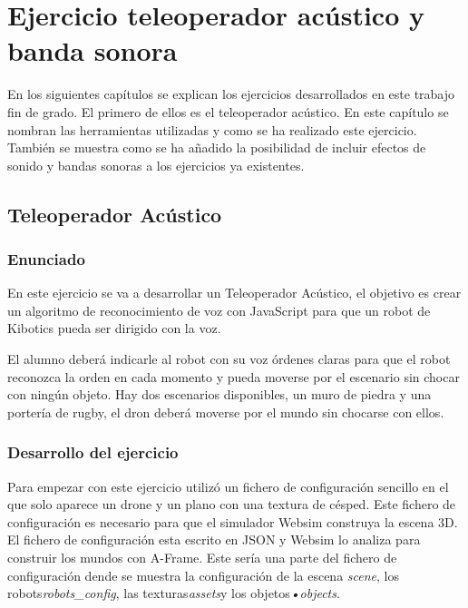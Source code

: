 \chapter{Ejercicio teleoperador acústico y banda sonora}\label{audio}
En los siguientes capítulos se explican los ejercicios desarrollados en este trabajo fin de grado. El primero de ellos es el teleoperador acústico. En este capítulo se nombran las herramientas utilizadas y como se ha realizado este ejercicio. También se muestra como se ha añadido la posibilidad de incluir efectos de sonido y bandas sonoras a los ejercicios ya existentes. 

\section{Teleoperador Acústico}
\subsection{Enunciado}
En este ejercicio se va a desarrollar un Teleoperador Acústico, el objetivo es crear un algoritmo de reconocimiento de voz con JavaScript para que un robot de Kibotics pueda ser dirigido con la voz. 

El alumno deberá indicarle  al robot con su voz órdenes claras para que el robot reconozca la orden en cada momento  y pueda moverse por el escenario sin chocar con ningún objeto. Hay dos escenarios disponibles, un muro de piedra y una portería de rugby, el dron deberá moverse por el mundo sin chocarse con ellos.

\subsection{Desarrollo del ejercicio}

Para empezar con este ejercicio utilizó un fichero de configuración sencillo en el que solo aparece un drone y un plano con una textura de césped. Este fichero de configuración es necesario para que el simulador Websim construya la escena 3D. El fichero de configuración esta escrito en JSON y Websim lo analiza para construir los mundos con A-Frame. 
Este sería una parte del fichero de configuración dende se muestra la configuración de la escena \textit{scene}, los robots\textit{robots\_config}, las texturas\textit{assets}y los objetos\textit{•objects}.

